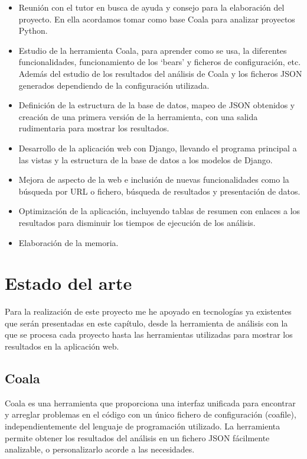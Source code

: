 \documentclass[a4paper, 12pt]{book}
\begin{document}
\begin{itemize}
  \item Reunión con el tutor en busca de ayuda y consejo para la elaboración del proyecto. En ella acordamos tomar como base Coala para analizar proyectos Python.
  \item Estudio de la herramienta Coala, para aprender como se usa, la diferentes funcionalidades, funcionamiento de los `bears' y ficheros de configuración, etc. Además del estudio de los resultados del análisis de Coala y los ficheros JSON generados dependiendo de la configuración utilizada.
  \item Definición de la estructura de la base de datos, mapeo de JSON obtenidos y creación de una primera versión de la herramienta, con una salida rudimentaria para mostrar los resultados.
  \item Desarrollo de la aplicación web con Django, llevando el programa principal a las vistas y la estructura de la base de datos a los modelos de Django.
  \item Mejora de aspecto de la web e inclusión de nuevas funcionalidades como la búsqueda por URL o fichero, búsqueda de resultados y presentación de datos.
  \item Optimización de la aplicación, incluyendo tablas de resumen con enlaces a los resultados para disminuir los tiempos de ejecución de los análisis.
  \item Elaboración de la memoria.
\end{itemize}



\cleardoublepage
\chapter{Estado del arte}
Para la realización de este proyecto me he apoyado en tecnologías ya existentes que serán presentadas en este capítulo, desde la herramienta de análisis con la que se procesa cada proyecto hasta las herramientas utilizadas para mostrar los resultados en la aplicación web.

\section{Coala} 
\label{sec:seccion1}
Coala es una herramienta que proporciona una interfaz unificada para encontrar y arreglar problemas en el código con un único fichero de configuración (coafile), independientemente del lenguaje de programación utilizado. La herramienta permite obtener los resultados del análisis en un fichero JSON fácilmente analizable, o personalizarlo acorde a las necesidades.~\cite{coala:_coala}
\end{document}
